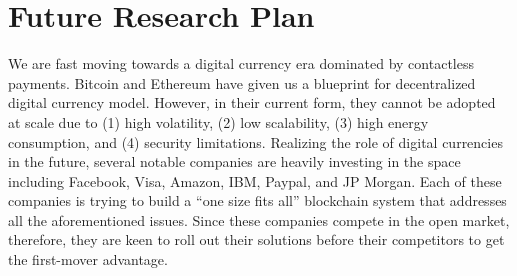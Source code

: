 \documentclass{NSF}
\begin{document}




\section{Future Research Plan}
We are fast moving towards a digital currency era dominated by contactless payments. Bitcoin and Ethereum have given us a blueprint for decentralized digital currency model. However, in their current form, they cannot be adopted at scale due to (1) high volatility, (2) low scalability, (3) high energy consumption, and (4) security limitations. Realizing the role of digital currencies in the future, several notable companies are heavily investing in the space including Facebook, Visa, Amazon, IBM, Paypal, and JP Morgan. Each of these companies is trying to build a ``one size fits all'' blockchain system that addresses all the aforementioned issues. Since these companies compete in the open market, therefore, they are keen to roll out their solutions before their competitors to get the first-mover advantage. 
\end{document}
